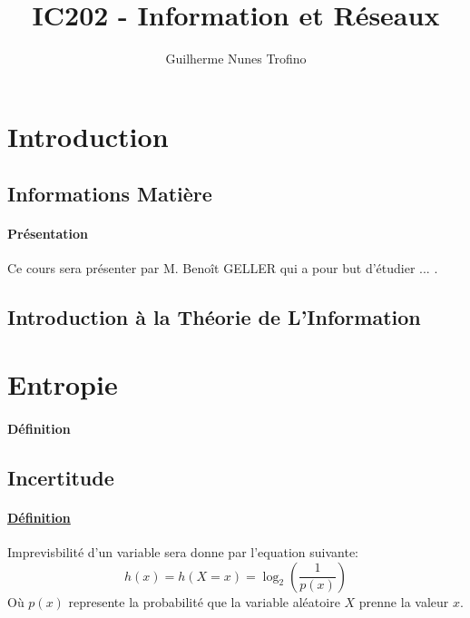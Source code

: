 \documentclass{article}
\title{IC202 - Information et Réseaux}
\author{Guilherme Nunes Trofino}
\begin{document}
\maketitle

\newpage\tableofcontents

\section{Introduction}



\subsection{Informations Matière}
\paragraph{Présentation}Ce cours sera présenter par M. Benoît GELLER qui a pour but d'étudier ... .

\subsection{Introduction à la Théorie de L'Information}

\section{Entropie}
\paragraph{Définition}

\subsection{Incertitude}
\paragraph{\href{https://fr.wikipedia.org/wiki/Incertitude}{Définition}}Imprevisbilité d'un variable sera donne par l'equation suivante:
\begin{equation}\label{eq:incertitude}
    \boxed{
        h(x) = h(X=x) = \log_{2} \left(\frac{1}{p(x)}\right)
    }
\end{equation}
Où $p(x)$ represente la probabilité que la variable aléatoire $X$ prenne la valeur $x$.
\end{document}

